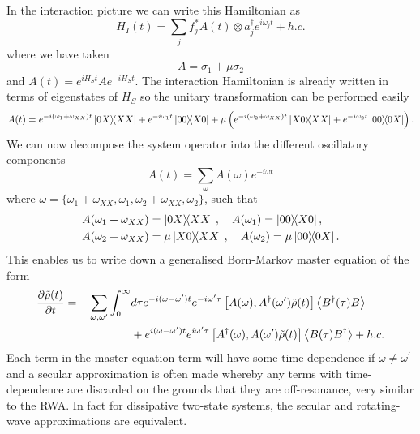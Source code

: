 \documentclass[]{article}
\begin{document}
In the interaction picture we can write this Hamiltonian as 
\begin{equation}
\label{eq:IDecomposition}
H_I(t) = \sum_{j}f_j^*A(t)\otimes a_j^{\dagger}e^{i\omega_j t} + h.c. 
\end{equation}
where we have taken
\begin{equation}
\label{eq:SystemOperator}
A = \sigma_1 + \mu\sigma_2
\end{equation}
and $A(t) = e^{i H_S t} A e^{-i H_S t}$. The interaction Hamiltonian is already written in terms of eigenstates of $H_S$ so the unitary transformation can be performed easily
\begin{equation}
A(t) = e^{-i(\omega_1 + \omega_{XX})t} \dyad{0X}{XX} + e^{-i\omega_1 t} \dyad{00}{X0} + \mu\left(e^{-i(\omega_2 + \omega_{XX})t} \dyad{X0}{XX} + e^{-i\omega_2t} \dyad{00}{0X}\right).
\end{equation}
We can now decompose the system operator into the different oscillatory components
\begin{equation}
A(t) = \sum_{\omega}A(\omega)e^{-i\omega t}
\end{equation}
where $\omega = \{\omega_1+\omega_{XX}, \omega_1, \omega_2 + \omega_{XX}, \omega_2\}$, such that
\begin{align}
A(\omega_1+\omega_{XX}) &= \dyad{0X}{XX}, \quad  A(\omega_1) = \dyad{00}{X0},\\ A(\omega_2+\omega_{XX}) &= \mu\dyad{X0}{XX}, \quad A(\omega_2) = \mu\dyad{00}{0X}.
\end{align}
This enables us to write down a generalised Born-Markov master equation of the form
\begin{align}
\label{eq:generalBM}
\begin{split}
\pdv{\tilde{\rho}(t)}{t} = - \sum_{\omega, \omega^{\prime}}\int_{0}^{\infty}& d\tau e^{-i(\omega-\omega^{\prime})t} e^{-i\omega^{\prime}\tau} \left[A(\omega), A^{\dagger}(\omega^{\prime})\tilde{\rho}(t)\right] \expval{B^{\dagger}(\tau)B} \\
&+ e^{i(\omega-\omega^{\prime})t} e^{i\omega^{\prime}\tau} \left[A^{\dagger}(\omega), A(\omega^{\prime})\tilde{\rho}(t)\right] \expval{B(\tau)B^{\dagger}} + h.c. 
\end{split}
\end{align}
Each term in the master equation term will have some time-dependence if $\omega \neq\omega^{\prime}$ and a secular approximation is often made whereby any terms with time-dependence are discarded on the grounds that they are off-resonance, very similar to the RWA. In fact for dissipative two-state systems, the secular and rotating-wave approximations are equivalent.
\end{document}
